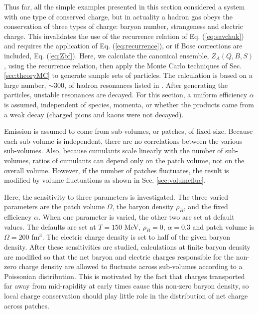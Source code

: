 Thus far, all the simple examples presented in this section considered a system with one type of conserved charge, but in actuality a hadron gas obeys the conservation of three types of charge: baryon number, strangeness and electric charge. This invalidates the use of the recurrence relation of Eq. (\ref{eq:savchuk}) and requires the application of Eq. (\ref{eq:recurrence}), or if Bose corrections are included, Eq. (\ref{eq:Zbf}). Here, we calculate the canonical ensemble, $Z_A(Q,B,S)$, using the recurrence relation, then apply the Monte Carlo techniques of Sec. \ref{sec:theoryMC} to generate sample sets of particles. The calculation is based on a large number, $\sim 300$, of hadron resonances listed in \cite{Tanabashi:2018oca}. After generating the particles, unstable resonances are decayed. For this section, a uniform efficiency $\alpha$ is assumed, independent of species, momenta, or whether the products came from a weak decay (charged pions and kaons were not decayed).

Emission is assumed to come from sub-volumes, or patches, of fixed size. Because each sub-volume is independent, there are no correlations between the various sub-volumes. Also, because cumulants scale linearly with the number of sub-volumes, ratios of cumulants can depend only on the patch volume, not on the overall volume. However, if the number of patches fluctuates, the result is modified by volume fluctuations as shown in Sec. \ref{sec:volumefluc}.

Here, the sensitivity to three parameters is investigated. The three varied parameters are the patch volume $\Omega$, the baryon density $\rho_B$, and the fixed efficiency $\alpha$. When one parameter is varied, the other two are set at default values. The defaults are set at $T=150$ MeV, $\rho_B=0$, $\alpha=0.3$ and patch volume is $\Omega=200$ fm$^3$. The electric charge density is set to half of the given baryon density. After these sensitivities are studied, calculations at finite baryon density are modified so that the net baryon and electric charges responsible for the non-zero charge density are allowed to fluctuate across sub-volumes according to a Poissonian distribution. This is motivated by the fact that charges transported far away from mid-rapidity at early times cause this non-zero baryon density, so local charge conservation should play little role in the distribution of net charge across patches.

